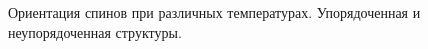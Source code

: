 \documentclass[oneside,final,14pt]{extarticle}
\begin{document}
\begin{figure}[h]
\centering
{}
\qquad
{}
\caption{Ориентация спинов при различных температурах. Упорядоченная и неупорядоченная структуры.}
\label{ris:orient}
\end{figure}
\end{document}
